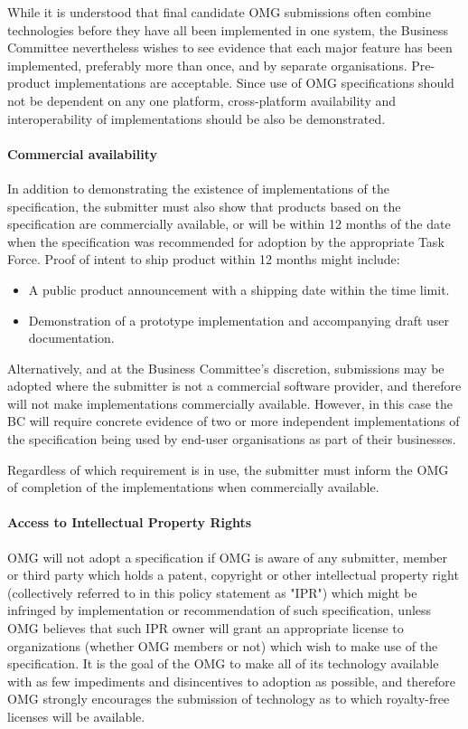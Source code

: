 While it is understood that final candidate OMG submissions often combine technologies before they have all been implemented in one system, the Business Committee nevertheless wishes to see evidence that each major feature has been implemented, preferably more than once, and by separate organisations. Pre-product implementations are acceptable. Since use of OMG specifications should not be dependent on any one platform, cross-platform availability and interoperability of implementations should be also be demonstrated.


\paragraph{Commercial availability}

In addition to demonstrating the existence of implementations of the specification, the submitter must also show that products based on the specification are commercially available, or will be within 12 months of the date when the specification was recommended for adoption by the appropriate Task Force. Proof of intent to ship product within 12 months might include:

\begin{itemize}
\item 	A public product announcement with a shipping date within the time limit.
\item     Demonstration of a prototype implementation and accompanying draft user documentation.
\end{itemize}

Alternatively, and at the Business Committee's discretion, submissions may be adopted where the submitter is not a commercial software provider, and therefore will not make implementations commercially available. However, in this case the BC will require concrete evidence of two or more independent implementations of the specification being used by end-user organisations as part of their businesses.

Regardless of which requirement is in use, the submitter must inform the OMG of completion of the implementations when commercially available.


\paragraph{Access to Intellectual Property Rights}

OMG will not adopt a specification if OMG is aware of any submitter, member or third party which holds a patent, copyright or other intellectual property right (collectively referred to in this policy statement as "IPR") which might be infringed by implementation or recommendation of such specification, unless OMG believes that such IPR owner will grant an appropriate license to organizations (whether OMG members or not) which wish to make use of the specification. It is the goal of the OMG to make all of its technology available with as few impediments and disincentives to adoption as possible, and therefore OMG strongly encourages the submission of technology as to which royalty-free licenses will be available.

